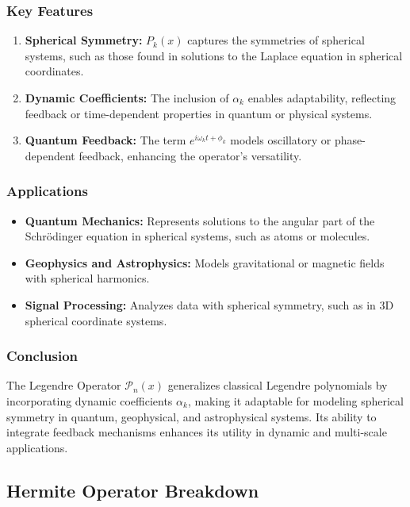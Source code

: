 \documentclass{article}
\theoremstyle{plain}
\begin{document}
\subsubsection*{Key Features}
\begin{enumerate}
    \item \textbf{Spherical Symmetry:} \( P_k(x) \) captures the symmetries of spherical systems, such as those found in solutions to the Laplace equation in spherical coordinates.
    \item \textbf{Dynamic Coefficients:} The inclusion of \( \alpha_k \) enables adaptability, reflecting feedback or time-dependent properties in quantum or physical systems.
    \item \textbf{Quantum Feedback:} The term \( e^{i \omega_k t + \phi_k} \) models oscillatory or phase-dependent feedback, enhancing the operator's versatility.
\end{enumerate}

\subsubsection*{Applications}
\begin{itemize}
    \item \textbf{Quantum Mechanics:} Represents solutions to the angular part of the Schrödinger equation in spherical systems, such as atoms or molecules.
    \item \textbf{Geophysics and Astrophysics:} Models gravitational or magnetic fields with spherical harmonics.
    \item \textbf{Signal Processing:} Analyzes data with spherical symmetry, such as in 3D spherical coordinate systems.
\end{itemize}

\subsubsection*{Conclusion}
The Legendre Operator \( \mathcal{P}_n(x) \) generalizes classical Legendre polynomials by incorporating dynamic coefficients \( \alpha_k \), making it adaptable for modeling spherical symmetry in quantum, geophysical, and astrophysical systems. Its ability to integrate feedback mechanisms enhances its utility in dynamic and multi-scale applications.


\subsection{Hermite Operator Breakdown}
\end{document}
